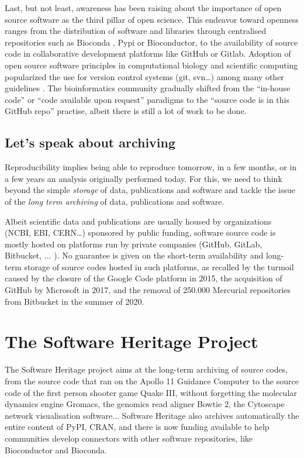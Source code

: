 \documentclass[long, final]{jobim}
\begin{document}
Last, but not least, awareness has been raising about the importance of open source software as the third pillar of open science. This endeavor toward openness ranges from the distribution of software and libraries through centralised repositories such as Bioconda \cite{gruning2018a}, Pypi or Bioconductor, to the availability of source code in collaborative development platforms like GitHub or Gitlab. Adoption of open source software principles in computational biology and scientific computing popularized the use for version control systems (git, svn\ldots) among many other guidelines \cite{wilson2014,taschuk2017,jimenez2017}. The bioinformatics community gradually shifted from the “in-house code” or “code available upon request” paradigms to the “source code is in this GitHub repo” practise, albeit there is still a lot of work to be done\cite{cadwallader2021}.


\subsection{Let’s speak about archiving}
\label{sec:archiving}

Reproducibility implies being able to reproduce tomorrow, in a few months, or in a few years an analysis originally performed today.  For this, we need to think beyond the simple \textit{storage} of data, publications and software and tackle the issue of the \textit{long term archiving} of data, publications and software. 

Albeit scientific data and publications are usually housed by organizations (NCBI, EBI, CERN…) sponsored by public funding, software source code is mostly hosted on platforms run by private companies (GitHub, GitLab, Bitbucket, ... ). No guarantee is given on the short-term availability and long-term storage of source codes hosted in such platforms, as recalled by the turmoil caused by the closure of the Google Code platform in 2015, the acquisition of GitHub by Microsoft in 2017, and the removal of 250.000 Mercurial repositories from Bitbucket in the summer of 2020.



\section{The Software Heritage Project}
\label{sec:SWH}

The Software Heritage project\cite{dicosmo2017} aims at the long-term archiving of source codes, from the source code that ran on 
the Apollo 11 Guidance Computer\cite{Apollo11AGCsourcecode,TurnLEMaround}
to the source code of the first person shooter game Quake III\cite{QuakeIIIArena,rsqrt}, 
without forgetting the molecular dynamics engine Gromacs\cite{Gromacs,Gromacsv2021.1}, 
the genomics read aligner Bowtie 2\cite{Bowtie2,Bowtie2v242}, 
the Cytoscape\cite{Cytoscape} network visualisation software... 
Software Heritage also archives automatically the entire content of PyPI, CRAN, and there is now funding available to help communities develop connectors with other software repositories, like Bioconductor and Bioconda.
\end{document}
